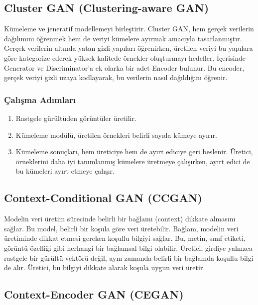 \newpage

\subsection{Cluster GAN (Clustering-aware GAN)}

Kümeleme ve jeneratif modellemeyi birleştirir. Cluster GAN, hem gerçek verilerin dağılımını öğrenmek hem de veriyi kümelere ayırmak amacıyla tasarlanmıştır. Gerçek verilerin altında yatan gizli yapıları öğrenirken, üretilen veriyi bu yapılara göre kategorize ederek yüksek kalitede örnekler oluşturmayı hedefler. İçerisinde Generator ve Discriminator'a ek olarka bir adet Encoder bulunur. Bu encoder, gerçek veriyi gizli uzaya kodlayarak, bu verilerin nasıl dağıldığını öğrenir.

\subsubsection{Çalışma Adımları}

\begin{enumerate}
    \item Rastgele gürültüden görüntüler üretilir.
    \item Kümeleme modülü, üretilen örnekleri belirli sayıda kümeye ayırır.
    \item Kümeleme sonuçları, hem üreticiye hem de ayırt ediciye geri beslenir. Üretici, örneklerini daha iyi tanımlanmış kümelere üretmeye çalışırken, ayırt edici de bu kümeleri ayırt etmeye çalışır.
\end{enumerate}

\newpage

\subsection{Context-Conditional GAN (CCGAN)}

Modelin veri üretim sürecinde belirli bir bağlamı (context) dikkate almasını sağlar. Bu model, belirli bir koşula göre veri üretebilir. Bağlam, modelin veri üretiminde dikkat etmesi gereken koşullu bilgiyi sağlar. Bu, metin, sınıf etiketi, görüntü özelliği gibi herhangi bir bağlamsal bilgi olabilir. Üretici, girdiye yalnızca rastgele bir gürültü vektörü değil, aynı zamanda belirli bir bağlamda koşullu bilgi de alır. Üretici, bu bilgiyi dikkate alarak koşula uygun veri üretir. 

\newpage

\subsection{Context-Encoder GAN (CEGAN)}

